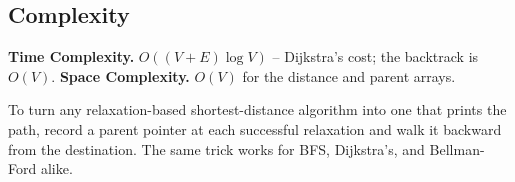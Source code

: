 \subsection*{Complexity}

\begin{complexitybox}
\textbf{Time Complexity.} $O((V+E)\log V)$ -- Dijkstra's cost; the
backtrack is $O(V)$. \textbf{Space Complexity.} $O(V)$ for the distance
and parent arrays.
\end{complexitybox}

\begin{takeawaybox}
To turn any relaxation-based shortest-distance algorithm into one that
prints the path, record a parent pointer at each successful relaxation
and walk it backward from the destination. The same trick works for
BFS, Dijkstra's, and Bellman-Ford alike.
\end{takeawaybox}
